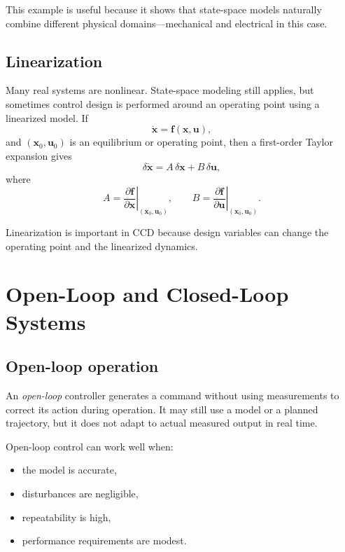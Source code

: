 \documentclass[11pt]{article}
\newcommand{\vect}[1]{\boldsymbol{#1}}
\newcommand{\state}{\vect{x}}
\newcommand{\ctrlu}{\vect{u}}
\begin{document}
This example is useful because it shows that state-space models naturally combine different physical domains---mechanical and electrical in this case.

\subsection{Linearization}

Many real systems are nonlinear. State-space modeling still applies, but sometimes control design is performed around an operating point using a linearized model. If
\begin{equation}
\dot{\state}=\vect{f}(\state,\ctrlu),
\end{equation}
and $(\state_0,\ctrlu_0)$ is an equilibrium or operating point, then a first-order Taylor expansion gives
\begin{equation}
\delta \dot{\state}=A\,\delta\state+B\,\delta\ctrlu,
\end{equation}
where
\begin{equation}
A=\left.\frac{\partial \vect{f}}{\partial \state}\right|_{(\state_0,\ctrlu_0)},
\qquad
B=\left.\frac{\partial \vect{f}}{\partial \ctrlu}\right|_{(\state_0,\ctrlu_0)}.
\end{equation}

Linearization is important in CCD because design variables can change the operating point and the linearized dynamics.

\section{Open-Loop and Closed-Loop Systems}

\subsection{Open-loop operation}

An \emph{open-loop} controller generates a command without using measurements to correct its action during operation. It may still use a model or a planned trajectory, but it does not adapt to actual measured output in real time.

Open-loop control can work well when:
\begin{itemize}[leftmargin=1.4em]
  \item the model is accurate,
  \item disturbances are negligible,
  \item repeatability is high,
  \item performance requirements are modest.
\end{itemize}
\end{document}
